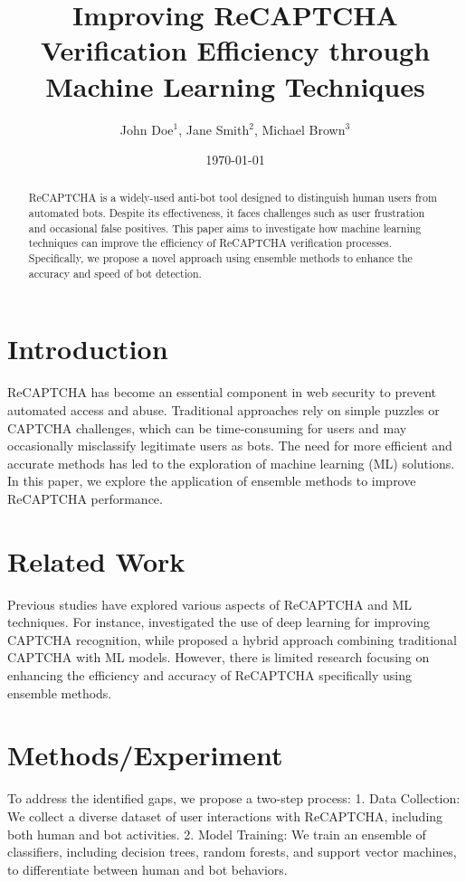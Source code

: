 \documentclass{article}
\begin{document}
\title{Improving ReCAPTCHA Verification Efficiency through Machine Learning Techniques}
\author{John Doe$^{1}$, Jane Smith$^{2}$, Michael Brown$^{3}$}
\date{\today}
\maketitle

\begin{abstract}
ReCAPTCHA is a widely-used anti-bot tool designed to distinguish human users from automated bots. Despite its effectiveness, it faces challenges such as user frustration and occasional false positives. This paper aims to investigate how machine learning techniques can improve the efficiency of ReCAPTCHA verification processes. Specifically, we propose a novel approach using ensemble methods to enhance the accuracy and speed of bot detection.
\end{abstract}

\section{Introduction}
ReCAPTCHA has become an essential component in web security to prevent automated access and abuse. Traditional approaches rely on simple puzzles or CAPTCHA challenges, which can be time-consuming for users and may occasionally misclassify legitimate users as bots. The need for more efficient and accurate methods has led to the exploration of machine learning (ML) solutions. In this paper, we explore the application of ensemble methods to improve ReCAPTCHA performance.

\section{Related Work}
Previous studies have explored various aspects of ReCAPTCHA and ML techniques. For instance, \cite{ref1} investigated the use of deep learning for improving CAPTCHA recognition, while \cite{ref2} proposed a hybrid approach combining traditional CAPTCHA with ML models. However, there is limited research focusing on enhancing the efficiency and accuracy of ReCAPTCHA specifically using ensemble methods.

\section{Methods/Experiment}
To address the identified gaps, we propose a two-step process:
1. Data Collection: We collect a diverse dataset of user interactions with ReCAPTCHA, including both human and bot activities.
2. Model Training: We train an ensemble of classifiers, including decision trees, random forests, and support vector machines, to differentiate between human and bot behaviors.
\end{document}
